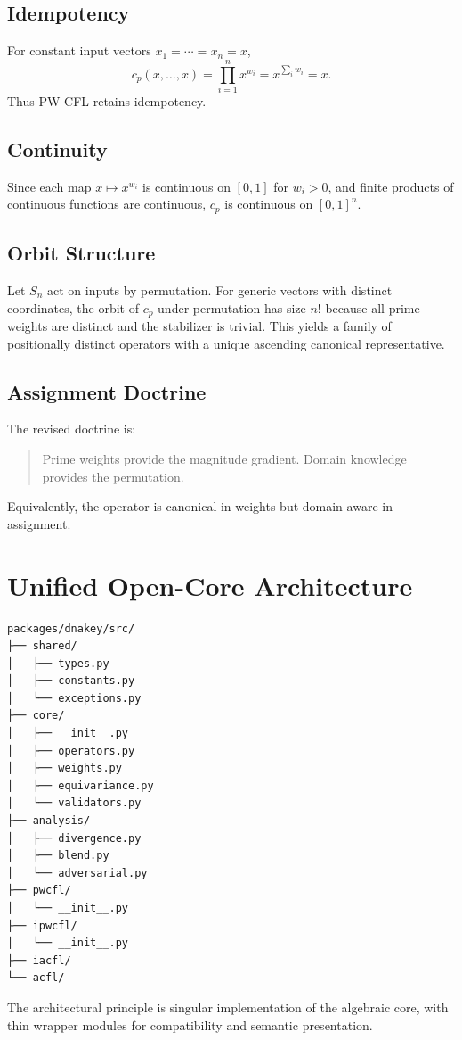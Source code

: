 \documentclass[11pt]{article}
\begin{document}
\subsection{Idempotency}
For constant input vectors $x_1=\cdots=x_n=x$,
\[
 c_p(x,\dots,x) = \prod_{i=1}^{n} x^{w_i} = x^{\sum_i w_i} = x.
\]
Thus PW-CFL retains idempotency.

\subsection{Continuity}
Since each map $x \mapsto x^{w_i}$ is continuous on $[0,1]$ for $w_i>0$, and finite products of continuous functions are continuous, $c_p$ is continuous on $[0,1]^n$.

\subsection{Orbit Structure}
Let $S_n$ act on inputs by permutation. For generic vectors with distinct coordinates, the orbit of $c_p$ under permutation has size $n!$ because all prime weights are distinct and the stabilizer is trivial. This yields a family of positionally distinct operators with a unique ascending canonical representative.

\subsection{Assignment Doctrine}
The revised doctrine is:
\begin{quote}
Prime weights provide the magnitude gradient. Domain knowledge provides the permutation.
\end{quote}
Equivalently, the operator is canonical in weights but domain-aware in assignment.

\section{Unified Open-Core Architecture}
\begin{verbatim}
packages/dnakey/src/
├── shared/
│   ├── types.py
│   ├── constants.py
│   └── exceptions.py
├── core/
│   ├── __init__.py
│   ├── operators.py
│   ├── weights.py
│   ├── equivariance.py
│   └── validators.py
├── analysis/
│   ├── divergence.py
│   ├── blend.py
│   └── adversarial.py
├── pwcfl/
│   └── __init__.py
├── ipwcfl/
│   └── __init__.py
├── iacfl/
└── acfl/
\end{verbatim}

The architectural principle is singular implementation of the algebraic core, with thin wrapper modules for compatibility and semantic presentation.
\end{document}
